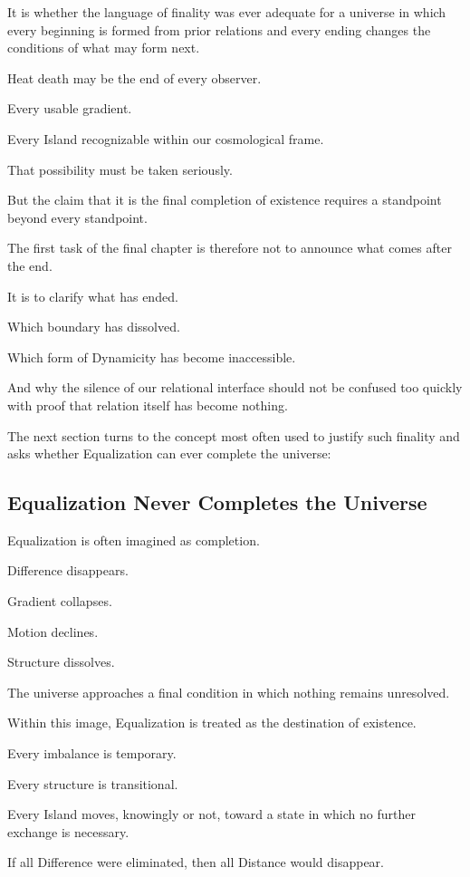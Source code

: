 It is whether the language of finality was ever adequate for a universe in which every beginning is formed from prior relations and every ending changes the conditions of what may form next.

Heat death may be the end of every observer.

Every usable gradient.

Every Island recognizable within our cosmological frame.

That possibility must be taken seriously.

But the claim that it is the final completion of existence requires a standpoint beyond every standpoint.

The first task of the final chapter is therefore not to announce what comes after the end.

It is to clarify what has ended.

Which boundary has dissolved.

Which form of Dynamicity has become inaccessible.

And why the silence of our relational interface should not be confused too quickly with proof that relation itself has become nothing.

The next section turns to the concept most often used to justify such finality and asks whether Equalization can ever complete the universe:

\subsection*{\textbf{Equalization Never Completes the Universe}} 

Equalization is often imagined as completion.

Difference disappears.

Gradient collapses.

Motion declines.

Structure dissolves.

The universe approaches a final condition in which nothing remains unresolved.

Within this image, Equalization is treated as the destination of existence.

Every imbalance is temporary.

Every structure is transitional.

Every Island moves, knowingly or not, toward a state in which no further exchange is necessary.

If all Difference were eliminated, then all Distance would disappear.

